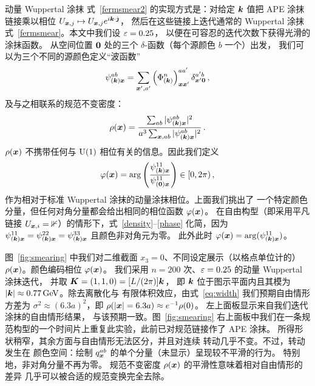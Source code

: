 动量 Wuppertal 涂抹
式~\eqref{fermsmear2} 的实现方式是：对给定 $\boldsymbol{k}$ 值把 APE 涂抹链接乘以相位
$U_{\boldsymbol{x},j}\mapsto U_{\boldsymbol{x},j}e^{i\boldsymbol{k}\cdot\hat{\boldsymbol{\jmath}}}$，
然后在这些链接上迭代通常的 Wuppertal 涂抹
式~\eqref{fermsmear}。本文中我们设 $\varepsilon=0.25$，
以便在可容忍的迭代次数下获得光滑的涂抹函数。
从空间位置 $\boldsymbol{0}$ 处的三个 $\delta$-函数（每个源颜色 $b$ 一个）出发，
我们可以为三个不同的源颜色定义``波函数''
\begin{equation}
\psi_{(\boldsymbol{k})\boldsymbol{x}}^{ab}=\sum_{\boldsymbol{x}',a'}\left(\Phi_{(\boldsymbol{k})}^n\right)_{\boldsymbol{x}\boldsymbol{x}'}^{aa'}\delta_{\boldsymbol{x}'\boldsymbol{0}}^{a'b}\,,
\end{equation}
及与之相联系的规范不变密度：
\begin{equation}
\label{density}
\rho(\boldsymbol{x})=\frac{\sum_{ab}|\psi_{(\boldsymbol{k})\boldsymbol{x}}^{ab}|^2}
{a^3\sum_{\boldsymbol{x},ab}|\psi_{(\boldsymbol{k})\boldsymbol{x}}^{ab}|^2}\,.
\end{equation}
$\rho(\boldsymbol{x})$ 不携带任何与 $\textmd{U}(1)$ 相位有关的信息。因此我们定义
\begin{equation}
\label{phase}
\varphi(\boldsymbol{x})=\arg\left(\frac{\psi_{(\boldsymbol{k})\boldsymbol{x}}^{11}}{
\psi_{(\boldsymbol{0})\boldsymbol{x}}^{11}}\right)\in[0,2\pi)\,,
\end{equation}
作为相对于标准 Wuppertal 涂抹的动量涂抹相位。上面我们挑出了
一个特定颜色分量，但任何对角分量都会给出相同的相位函数 $\varphi(\boldsymbol{x})$。
在自由构型（即采用平凡链接
$U_{\boldsymbol{x},i}=\mathbb{1}$）的情形下，式~\eqref{density}--\eqref{phase}
化简，因为 $\psi_{(\boldsymbol{k})\boldsymbol{x}}^{11}=\psi_{(\boldsymbol{k})\boldsymbol{x}}^{22}
=\psi_{(\boldsymbol{k})\boldsymbol{x}}^{33}$ 且颜色非对角元为零。
此外此时 $\varphi(\boldsymbol{x})=\arg(\psi_{(\boldsymbol{k})\boldsymbol{x}}^{11})$。

图~\ref{fig:smearing} 中我们对二维截面 $x_3=0$、不同设定展示（以格点单位计的）$\rho(\boldsymbol{x})$。颜色编码相位 $\varphi(\boldsymbol{x})$。
我们采用 $n=200$ 次、$\varepsilon=0.25$ 的动量 Wuppertal 涂抹迭代，
并取 $\boldsymbol{K}=(1,1,0)=[L/(2\pi)]\boldsymbol{k}$，
即 $\boldsymbol{k}$ 位于图示平面内且其模为
$|\boldsymbol{k}|\approx 0.77\,\textmd{GeV}$。除去离散化与
有限体积效应，由式~\eqref{eq:width} 我们预期自由情形方差为 $\sigma^2\approx (6.3a)^2$，即
$\rho(|\boldsymbol{x}|=6.3a)\approx e^{-1}\rho(0)$。
左上面板显示来自我们迭代涂抹的自由情形结果，
与该预期一致。图~\ref{fig:smearing} 右上面板中我们在一条规范构型的一个时间片上重复此实验，此前已对规范链接作了 APE 涂抹。
所得形状稍窄，其余方面与自由情形无法区分，并且对连续
转动几乎不变。不过，转动发生在
颜色空间：绘制 $q^{ab}_{\boldsymbol{x}}$ 的单个分量（未显示）呈现较不平滑的行为。
特别地，非对角分量不再为零。
规范不变密度 $\rho(\boldsymbol{x})$
的平滑性意味着相对自由情形的差异
几乎可以被合适的规范变换完全去除。


